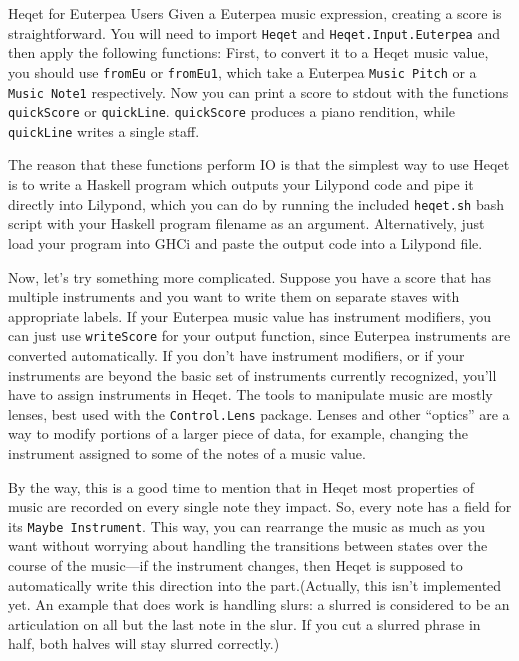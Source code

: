 \documentclass{article}
\begin{document}
\begin{section}{Heqet for Euterpea Users}
Given a Euterpea music expression, creating a score is
 straightforward. You will need to import \verb+Heqet+ 
 and \verb+Heqet.Input.Euterpea+ and then apply the following functions:
First, to convert it to a Heqet music value, 
you should use \verb+fromEu+ or \verb+fromEu1+, which take a Euterpea \verb+Music Pitch+ or a \verb+Music Note1+ respectively. Now you can print a score to
 stdout with the functions \verb+quickScore+ or \verb+quickLine+. \verb+quickScore+ produces a piano rendition, while \verb+quickLine+ writes a single staff. 
 
 The reason that these functions perform IO is that the 
 simplest way to use Heqet is to write a Haskell program which outputs your Lilypond code and 
 pipe it directly into Lilypond, which you can do by running the included \verb+heqet.sh+ bash script with your Haskell program filename as an argument. Alternatively, just load your program into GHCi and paste the output code into a Lilypond file.

Now, let's try something more complicated. Suppose you have a score that has multiple instruments and you want to write them on separate staves with appropriate labels. If your Euterpea music value has instrument modifiers, you can just use \verb+writeScore+ for your output function, since Euterpea instruments are converted automatically. If you don't have instrument modifiers, or if your instruments are beyond the basic set of instruments currently recognized, you'll have to assign instruments in Heqet. The tools to manipulate music are mostly lenses, best used with the \verb+Control.Lens+ package. Lenses and other ``optics'' are a way to modify portions of a larger piece of data, for example, changing the instrument assigned to some of the notes of a music value. 

By the way, this is a good time to mention that in Heqet most properties of music are recorded on every single note they impact. So, every note has a field for its \verb+Maybe Instrument+. This way, you can rearrange the music as much as you want without worrying about handling the transitions between states over the course of the music---if the instrument changes, then Heqet is supposed to automatically write this direction into the part.(Actually, this isn't implemented yet. An example that does work is handling slurs: a slurred is considered to be an articulation on all but the last note in the slur. If you cut a slurred phrase in half, both halves will stay slurred correctly.) 


\end{section}
\end{document}

